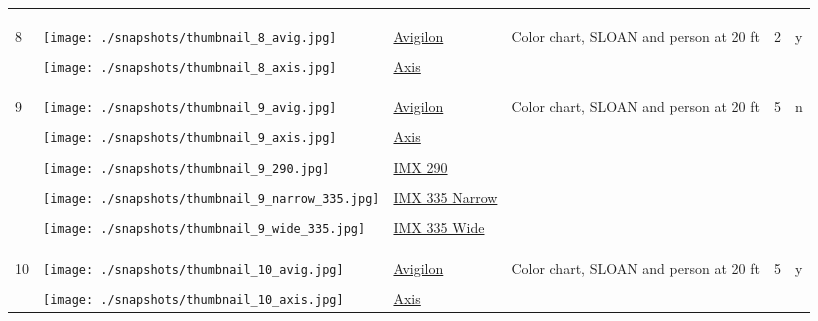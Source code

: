 \documentclass{article}%
\begin{document}
\begin{longtabu}{m{2.5cm} m{4cm} m{2cm} m{4cm} m{2cm} m{2cm}}
&&&&&\\%
&&&&&\\%
\hline%
&&&&&\\%
8&\texttt{[image: ./snapshots/thumbnail\_8\_avig.jpg]}&\href{https://drive.google.com/file/d/1dIMfIvu4PNXc4fBl0NWdB_pRMQ6uOnRl/view?usp=sharing}{Avigilon}&Color chart, SLOAN and person at 20 ft&2&y\\%
&&&&&\\%
&\texttt{[image: ./snapshots/thumbnail\_8\_axis.jpg]}&\href{https://drive.google.com/file/d/1CdmQ9ZqpQhFciiErRFA1oyzv_LDTw08f/view?usp=sharing}{Axis}&&&\\%
&&&&&\\%
&&&&&\\%
\hline%
&&&&&\\%
9&\texttt{[image: ./snapshots/thumbnail\_9\_avig.jpg]}&\href{https://drive.google.com/file/d/1-nkgyYF5XQGoX78rVhqMn-urWQTx7N5H/view?usp=sharing}{Avigilon}&Color chart, SLOAN and person at 20 ft&5&n\\%
&&&&&\\%
&\texttt{[image: ./snapshots/thumbnail\_9\_axis.jpg]}&\href{https://drive.google.com/file/d/1Wksqn2RFeL8PvKrpSK_-9BojnGTA-myy/view?usp=sharing}{Axis}&&&\\%
&&&&&\\%
&\texttt{[image: ./snapshots/thumbnail\_9\_290.jpg]}&\href{https://drive.google.com/file/d/17ozV-Gmt341mVcATrnqn1vQrTIJ5zGFD/view?usp=sharing}{IMX 290}&&&\\%
&&&&&\\%
&\texttt{[image: ./snapshots/thumbnail\_9\_narrow\_335.jpg]}&\href{https://drive.google.com/file/d/1XLKox52boq9CPdTEdJzQeL3ovW9pv7-0/view?usp=sharing}{IMX 335 Narrow}&&&\\%
&&&&&\\%
&\texttt{[image: ./snapshots/thumbnail\_9\_wide\_335.jpg]}&\href{https://drive.google.com/file/d/1JAG3ou_N4E42RGVmzAd49YMlXWBZ0w7z/view?usp=sharing}{IMX 335 Wide}&&&\\%
&&&&&\\%
&&&&&\\%
\hline%
&&&&&\\%
10&\texttt{[image: ./snapshots/thumbnail\_10\_avig.jpg]}&\href{https://drive.google.com/file/d/1nUAG04xCKvkZ-iGkHwqXTdi8gf36rWDZ/view?usp=sharing}{Avigilon}&Color chart, SLOAN and person at 20 ft&5&y\\%
&&&&&\\%
&\texttt{[image: ./snapshots/thumbnail\_10\_axis.jpg]}&\href{https://drive.google.com/file/d/1nabKrH0qS27BZH8De6vlP_IgS_janqi1/view?usp=sharing}{Axis}&&&\\%

\end{longtabu}
\end{document}
